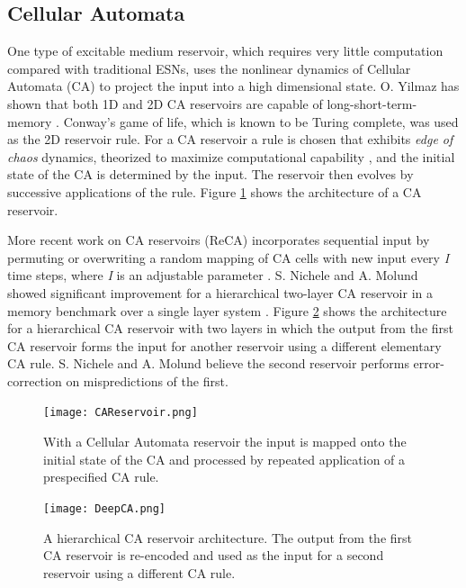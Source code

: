\documentclass{article}
\begin{document}
  \subsection{Cellular Automata}
     One type of excitable medium reservoir, which requires very little 
     computation compared
     with traditional ESNs, uses the nonlinear dynamics of Cellular Automata 
     (CA)     to project the input into a high dimensional state. O.  Yilmaz 
     has shown that both 1D and 2D CA reservoirs are capable of 
     long-short-term-memory \cite{yilmaz2014reservoir}. Conway's game of life, 
     which is known to be Turing complete, was used as the 2D reservoir rule.  
     For a CA reservoir a rule is chosen that exhibits \textit{edge of chaos} 
     dynamics, theorized to maximize computational capability 
     \cite{langton1990computation}, and the initial state of the CA is 
     determined by the input. The reservoir then evolves by successive 
     applications of the rule. Figure \ref{CAReservoir} shows the architecture 
     of a CA reservoir. \par More recent work on CA reservoirs (ReCA) 
    incorporates sequential input by permuting or overwriting a random mapping 
    of CA cells with new input every \textit{I} time steps, where \textit{I} is 
    an adjustable parameter \cite{bye2016investigation}. S.  Nichele and A.  
    Molund showed significant improvement for a hierarchical two-layer CA 
    reservoir in a memory benchmark over a single layer system 
    \cite{nichele2017deep}.  Figure \ref{DeepCA} shows the architecture for a 
    hierarchical CA reservoir with two layers in which the output from the 
    first CA reservoir forms the input for another reservoir using a different 
    elementary CA rule. S. Nichele and A. Molund believe the second reservoir  
    performs error-correction on mispredictions of the first.





    \begin{figure}[h!]
    \centering
    \texttt{[image: CAReservoir.png]}
    \caption{With a  Cellular Automata reservoir the input is mapped onto the 
        initial state of the CA and processed by repeated application of a 
            prespecified CA rule. \cite{yilmaz2015connectionist}}
            \label{CAReservoir}
            \end{figure}


     \begin{figure}[h!]
        \centering
            \texttt{[image: DeepCA.png]}
    \caption{ A hierarchical CA reservoir architecture.  The output from the 
        first CA reservoir is re-encoded and used as the input for a second 
            reservoir using a different CA rule. \cite{nichele2017deep}}

            \label{DeepCA}
            \end{figure}
\end{document}
